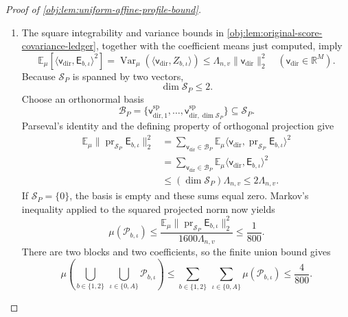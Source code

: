 \begin{proof}[Proof of \cref{obj:lem:uniform-affine-profile-bound}]
\begin{enumerate}
\item
The square integrability and variance bounds in \cref{obj:lem:original-score-covariance-ledger}, together with the coefficient means just computed, imply
\[
\mathbb E_\mu\!\left[
\langle \mathsf v_{\mathrm{dir}},\mathsf E_{b,\iota}\rangle^2
\right]
=
\operatorname{Var}_\mu\!\left(\langle \mathsf v_{\mathrm{dir}},Z_{b,\iota}\rangle\right)
\le
\Lambda_{n,v}\|\mathsf v_{\mathrm{dir}}\|_2^2
\quad(\mathsf v_{\mathrm{dir}}\in\mathbb R^M).
\]
Because \(\mathcal S_P\) is spanned by two vectors,
\[
\dim\mathcal S_P\le2.
\]
Choose an orthonormal basis
\[
\mathcal B_P
=
\{\mathsf v^{\mathrm{sp}}_{\mathrm{dir},1},\ldots,\mathsf v^{\mathrm{sp}}_{\mathrm{dir},\dim\mathcal S_P}\}
\subseteq\mathcal S_P.
\]
Parseval's identity and the defining property of orthogonal projection give
\[
\begin{aligned}
\mathbb E_\mu
\|\operatorname{pr}_{\mathcal S_P}\mathsf E_{b,\iota}\|_2^2
&=
\sum_{\mathsf v_{\mathrm{dir}}\in\mathcal B_P}
\mathbb E_\mu
\langle \mathsf v_{\mathrm{dir}},\operatorname{pr}_{\mathcal S_P}\mathsf E_{b,\iota}\rangle^2\\
&=
\sum_{\mathsf v_{\mathrm{dir}}\in\mathcal B_P}
\mathbb E_\mu\langle \mathsf v_{\mathrm{dir}},\mathsf E_{b,\iota}\rangle^2\\
&\le
(\dim\mathcal S_P)\Lambda_{n,v}
\le2\Lambda_{n,v}.
\end{aligned}
\]
If \(\mathcal S_P=\{0\}\), the basis is empty and these sums equal zero. Markov's inequality applied to the squared projected norm now yields
\[
\mu(\mathcal P_{b,\iota})
\le
\frac{
\mathbb E_\mu
\|\operatorname{pr}_{\mathcal S_P}\mathsf E_{b,\iota}\|_2^2
}{
1600\Lambda_{n,v}
}
\le\frac1{800}.
\]
There are two blocks and two coefficients, so the finite union bound gives
\[
\mu\left(
\bigcup_{b\in\{1,2\}}\ \bigcup_{\iota\in\{0,A\}}
\mathcal P_{b,\iota}
\right)
\le
\sum_{b\in\{1,2\}}\ \sum_{\iota\in\{0,A\}}
\mu(\mathcal P_{b,\iota})
\le\frac4{800}.
\]


\end{enumerate}
\end{proof}

